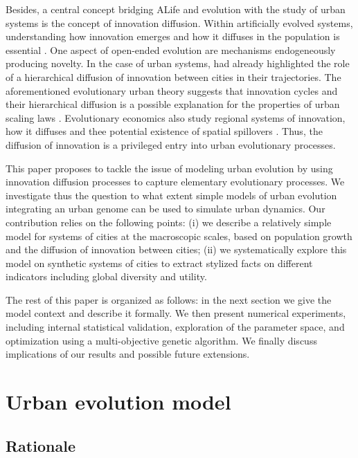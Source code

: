 \documentclass[letterpaper]{article}
\begin{document}
Besides, a central concept bridging ALife and evolution with the study of urban systems is the concept of innovation diffusion. Within artificially evolved systems, understanding how innovation emerges and how it diffuses in the population is essential \citep{bedau2000open}. One aspect of open-ended evolution are mechanisms endogeneously producing novelty. In the case of urban systems, \cite{hagerstrand1968innovation} had already highlighted the role of a hierarchical diffusion of innovation between cities in their trajectories. The aforementioned evolutionary urban theory suggests that innovation cycles and their hierarchical diffusion is a possible explanation for the properties of urban scaling laws \citep{pumain2006evolutionary}. Evolutionary economics also study regional systems of innovation, how it diffuses and thee potential existence of spatial spillovers \citep{uyarra2010evolutionary}. Thus, the diffusion of innovation is a privileged entry into urban evolutionary processes.



This paper proposes to tackle the issue of modeling urban evolution by using innovation diffusion processes to capture elementary evolutionary processes. We investigate thus the question to what extent simple models of urban evolution integrating an urban genome can be used to simulate urban dynamics. Our contribution relies on the following points: (i) we describe a relatively simple model for systems of cities at the macroscopic scales, based on population growth and the diffusion of innovation between cities; (ii) we systematically explore this model on synthetic systems of cities to extract stylized facts on different indicators including global diversity and utility.

The rest of this paper is organized as follows: in the next section we give the model context and describe it formally. We then present numerical experiments, including internal statistical validation, exploration of the parameter space, and optimization using a multi-objective genetic algorithm. We finally discuss implications of our results and possible future extensions.



\section{Urban evolution model}

\subsection{Rationale}
\end{document}
